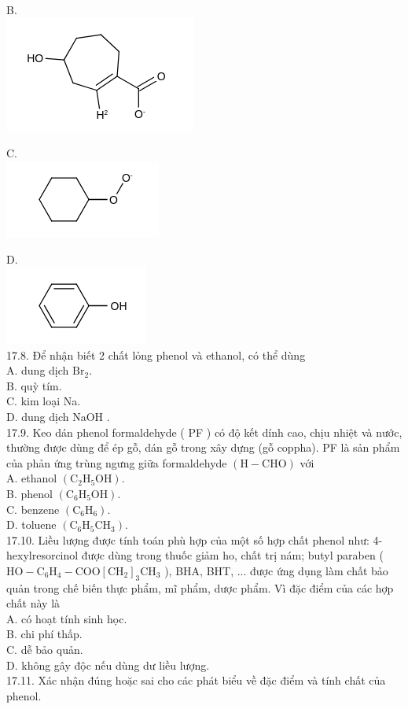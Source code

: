 \documentclass[10pt]{article}
\begin{document}
B.\\
\includegraphics{smile-75eda08907ad1db48bde08cb0ab965116d597869}

C.\\
\includegraphics{smile-41ca1d07b72ae310eb2a8105cec26c75e175b021}

D.\\
\includegraphics{smile-33ad7fe51b299856154947f755614f879bec7e0b}\\
17.8. Để nhận biết 2 chất lỏng phenol và ethanol, có thể dùng\\
A. dung dịch $\mathrm{Br}_{2}$.\\
B. quỳ tím.\\
C. kim loại Na.\\
D. dung dịch NaOH .\\
17.9. Keo dán phenol formaldehyde ( PF ) có độ kết dính cao, chịu nhiệt và nước, thường được dùng để ép gỗ, dán gỗ trong xây dựng (gỗ coppha). PF là sản phẩm của phản ứng trùng ngưng giữa formaldehyde $(\mathrm{H}-\mathrm{CHO})$ với\\
A. ethanol $\left(\mathrm{C}_{2} \mathrm{H}_{5} \mathrm{OH}\right)$.\\
B. phenol $\left(\mathrm{C}_{6} \mathrm{H}_{5} \mathrm{OH}\right)$.\\
C. benzene $\left(\mathrm{C}_{6} \mathrm{H}_{6}\right)$.\\
D. toluene $\left(\mathrm{C}_{6} \mathrm{H}_{5} \mathrm{CH}_{3}\right)$.\\
17.10. Liều lượng được tính toán phù hợp của một số hợp chất phenol như: 4-hexylresorcinol được dùng trong thuốc giảm ho, chất trị nám; butyl paraben ( $\mathrm{HO}-\mathrm{C}_{6} \mathrm{H}_{4}-\mathrm{COO}\left[\mathrm{CH}_{2}\right]_{3} \mathrm{CH}_{3}$ ), BHA, BHT, ... được ứng dụng làm chất bảo\\
quản trong chế biến thực phẩm, mĩ phẩm, dược phẩm. Vì đặc điểm của các hợp chất này là\\
A. có hoạt tính sinh học.\\
B. chi phí thấp.\\
C. dễ bảo quản.\\
D. không gây độc nếu dùng dư liều lượng.\\
17.11. Xác nhận đúng hoặc sai cho các phát biểu về đặc điểm và tính chất của phenol.
\end{document}

